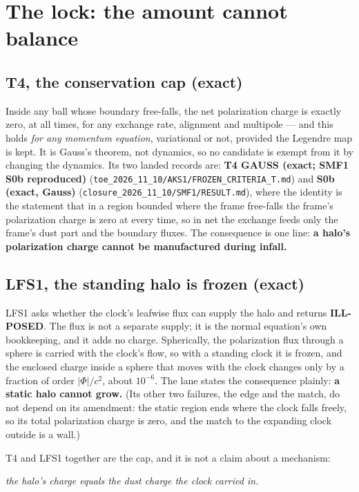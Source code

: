 \documentclass[10pt]{article}
\begin{document}
\section{The lock: the amount cannot balance}
\label{sec:lock}

\subsection{T4, the conservation cap (exact)}
Inside any ball whose boundary free-falls, the net polarization charge is exactly zero, at all times, for any exchange
rate, alignment and multipole --- and this holds {\it for any momentum equation}, variational or not, provided the Legendre
map is kept. It is Gauss's theorem, not dynamics, so no candidate is exempt from it by changing the dynamics. Its two
landed records are: \textbf{T4 GAUSS (exact; SMF1 S0b reproduced)} (\texttt{toe\_2026\_11\_10/AKS1/FROZEN\_CRITERIA\_T.md})
and \textbf{S0b (exact, Gauss)} (\texttt{closure\_2026\_11\_10/SMF1/RESULT.md}), where the identity is the statement that
in a region bounded where the frame free-falls the frame's polarization charge is zero at every time, so in net the exchange
feeds only the frame's dust part and the boundary fluxes.
The consequence is one line: {\bf a halo's polarization charge cannot be manufactured during infall.}

\subsection{LFS1, the standing halo is frozen (exact)}
LFS1 asks whether the clock's leafwise flux can supply the halo and returns {\bf ILL-POSED}. The flux is not a separate
supply; it is the normal equation's own bookkeeping, and it adds no charge. Spherically, the polarization flux through a
sphere is carried with the clock's flow, so with a standing clock it is frozen, and the enclosed charge inside a sphere
that moves with the clock changes only by a fraction of order $|\Phi|/c^2$, about $10^{-6}$. The lane states the consequence
plainly: {\bf a static halo cannot grow.} (Its other two failures, the edge and the match, do not depend on its
amendment: the static region ends where the clock falls freely, so its total polarization charge is zero, and the
match to the expanding clock outside is a wall.)

T4 and LFS1 together are the cap, and it is not a claim about a mechanism:
\begin{center}
\emph{the halo's charge equals the dust charge the clock carried in.}
\end{center}
\end{document}
